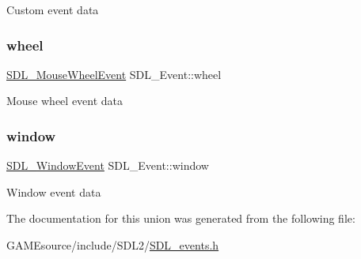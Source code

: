 Custom event data \mbox{\label{union_s_d_l___event_a267d3f550715519ec90a81ccd0e6cbda}} 
\subsubsection{\texorpdfstring{wheel}{wheel}}
{\footnotesize\ttfamily \mbox{\hyperlink{struct_s_d_l___mouse_wheel_event}{S\+D\+L\+\_\+\+Mouse\+Wheel\+Event}} S\+D\+L\+\_\+\+Event\+::wheel}

Mouse wheel event data \mbox{\label{union_s_d_l___event_a826936b3275406d857bc6654669fae71}} 
\subsubsection{\texorpdfstring{window}{window}}
{\footnotesize\ttfamily \mbox{\hyperlink{struct_s_d_l___window_event}{S\+D\+L\+\_\+\+Window\+Event}} S\+D\+L\+\_\+\+Event\+::window}

Window event data 

The documentation for this union was generated from the following file\+:\begin{DoxyCompactItemize}
\item 
G\+A\+M\+Esource/include/\+S\+D\+L2/\mbox{\hyperlink{_s_d_l__events_8h}{S\+D\+L\+\_\+events.\+h}}\end{DoxyCompactItemize}
